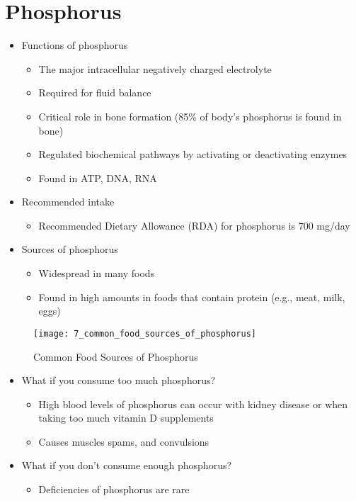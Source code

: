 \documentclass[title={Chapter 7}]{fdsn201notes}
\begin{document}
\section{Phosphorus}\label{sec:phosphorus}
\begin{itemize}
	\item Functions of phosphorus
	\begin{itemize}
		\item The major intracellular negatively charged electrolyte
		\item Required for fluid balance
		\item Critical role in bone formation (85\% of body's phosphorus is found in bone)
		\item Regulated biochemical pathways by activating or deactivating enzymes
		\item Found in ATP, DNA, RNA
	\end{itemize}
	\item Recommended intake
	\begin{itemize}
		\item Recommended Dietary Allowance (RDA) for phosphorus is 700 mg/day
	\end{itemize}
	\item Sources of phosphorus
	\begin{itemize}
		\item Widespread in many foods
		\item Found in high amounts in foods that contain protein (e.g., meat, milk, eggs)
	\end{itemize}
\end{itemize}

\begin{figure}[H]
	\centering
	\texttt{[image: 7\_common\_food\_sources\_of\_phosphorus]}
	\caption{Common Food Sources of Phosphorus}
	\label{fig:common_food_sources_of_phosphorus}
\end{figure}

\begin{itemize}
	\item What if you consume too much phosphorus?
	\begin{itemize}
		\item High blood levels of phosphorus can occur with kidney disease or when taking too much vitamin D supplements
		\item Causes muscles spams, and convulsions
	\end{itemize}
	\item What if you don't consume enough phosphorus?
	\begin{itemize}
		\item Deficiencies of phosphorus are rare
	\end{itemize}
\end{itemize}
\end{document}
